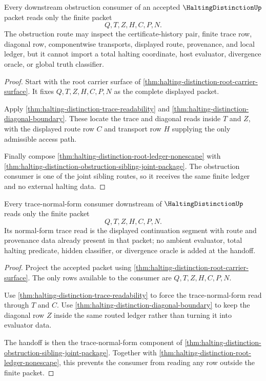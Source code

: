 \begin{theorem}
\label{thm:halting-distinction-root-obstruction-handoff-lock}
Every downstream obstruction consumer of an accepted $\HaltingDistinctionUp$ packet reads only the finite packet
$$
Q,T,Z,H,C,P,N.
$$
The obstruction route may inspect the certificate-history pair, finite trace row, diagonal row, componentwise transports, displayed route, provenance, and local ledger, but it cannot import a total halting coordinate, host evaluator, divergence oracle, or global truth classifier.
\end{theorem}
\begin{proof}
Start with the root carrier surface of \autoref{thm:halting-distinction-root-carrier-surface}. It fixes $Q,T,Z,H,C,P,N$ as the complete displayed packet.

Apply \autoref{thm:halting-distinction-trace-readability} and \autoref{thm:halting-distinction-diagonal-boundary}. These locate the trace and diagonal reads inside $T$ and $Z$, with the displayed route row $C$ and transport row $H$ supplying the only admissible access path.

Finally compose \autoref{thm:halting-distinction-root-ledger-nonescape} with \autoref{thm:halting-distinction-obstruction-sibling-joint-package}. The obstruction consumer is one of the joint sibling routes, so it receives the same finite ledger and no external halting data.
\end{proof}

\begin{theorem}
\label{thm:halting-distinction-root-trace-normalform-lock}
Every trace-normal-form consumer downstream of $\HaltingDistinctionUp$ reads only the finite packet
$$
Q,T,Z,H,C,P,N.
$$
Its normal-form trace read is the displayed continuation segment with route and provenance data already present in that packet; no ambient evaluator, total halting predicate, hidden classifier, or divergence oracle is added at the handoff.
\end{theorem}
\begin{proof}
Project the accepted packet using \autoref{thm:halting-distinction-root-carrier-surface}. The only rows available to the consumer are $Q,T,Z,H,C,P,N$.

Use \autoref{thm:halting-distinction-trace-readability} to force the trace-normal-form read through $T$ and $C$. Use \autoref{thm:halting-distinction-diagonal-boundary} to keep the diagonal row $Z$ inside the same routed ledger rather than turning it into evaluator data.

The handoff is then the trace-normal-form component of \autoref{thm:halting-distinction-obstruction-sibling-joint-package}. Together with \autoref{thm:halting-distinction-root-ledger-nonescape}, this prevents the consumer from reading any row outside the finite packet.
\end{proof}

